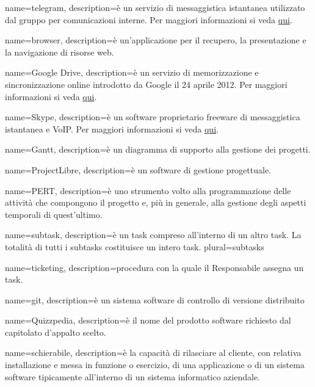  {
	name=telegram,
	description={è un servizio di messaggistica istantanea utilizzato dal gruppo per comunicazioni interne. Per maggiori informazioni si veda \href{https://it.wikipedia.org/wiki/Telegram_(software)}{qui}.}
}

 {
	name=browser,
	description={è un'applicazione per il recupero, la presentazione e la navigazione di risorse web.}
}

 {
	name=Google Drive,
	description={è un servizio di memorizzazione e sincronizzazione online introdotto da Google il 24 aprile 2012. Per maggiori informazioni si veda \href{https://it.wikipedia.org/wiki/Google_Drive}{qui}.}
}

 {
	name=Skype,
	description={è un software proprietario freeware di messaggistica istantanea e VoIP. Per maggiori informazioni si veda \href{https://it.wikipedia.org/wiki/Skype}{qui}.}
}

 {
	name=Gantt,
	description={è un diagramma di supporto alla gestione dei progetti.}
}

 {
	name=ProjectLibre,
	description={è un software di gestione progettuale.}
}

 {
	name=PERT,
	description={è uno strumento volto alla programmazione delle attività che compongono il progetto e, più in generale, alla gestione degli aspetti temporali di quest'ultimo.}
}

 {
	name=subtask,
	description={è un task compreso all'interno di un altro task. La totalità di tutti i subtasks costituisce un intero task.}
	plural=subtasks
}

 {
	name=ticketing,
	description={procedura con la quale il Responsabile assegna un task.}
}

 {
	name=git,
	description={è un sistema software di controllo di versione distribuito}
}

 {
	name=Quizzpedia,
	description={è il nome del prodotto software richiesto dal capitolato d'appalto scelto.}
}

 {
	name=schierabile,
	description={è la capacità di rilasciare al cliente, con relativa installazione e messa in funzione o esercizio, di una applicazione o di un sistema software tipicamente all'interno di un sistema informatico aziendale.}
}

